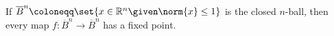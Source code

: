 If $\overline{B}^n \coloneqq \set{x \in \mathbb{R}^n\given \norm{x} \leq 1}$ is the
closed $n$-ball, then every map $f\colon \overline{B}^n\to \overline{B}^n$ has a
fixed point.

